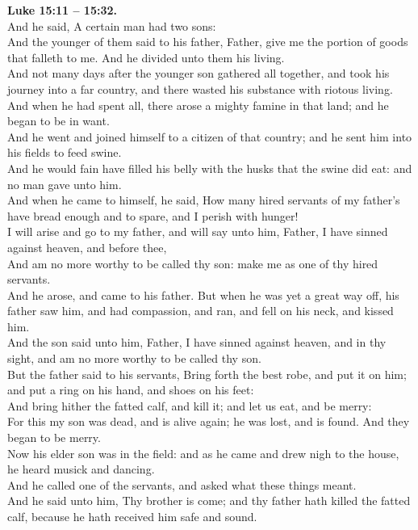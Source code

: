 \documentclass[10pt]{article} %
\begin{document}
{\begin{minipage}[t]{0.45\textwidth}
\textbf{Luke 15:11 -- 15:32.}\\
And he said, A certain man had two sons:\\
And the younger of them said to his father, Father, give me the portion of goods that falleth to me. And he divided unto them his living.\\
And not many days after the younger son gathered all together, and took his journey into a far country, and there wasted his substance with riotous living.\\
And when he had spent all, there arose a mighty famine in that land; and he began to be in want.\\
And he went and joined himself to a citizen of that country; and he sent him into his fields to feed swine.\\
And he would fain have filled his belly with the husks that the swine did eat: and no man gave unto him.\\
And when he came to himself, he said, How many hired servants of my father's have bread enough and to spare, and I perish with hunger!\\
I will arise and go to my father, and will say unto him, Father, I have sinned against heaven, and before thee,\\
And am no more worthy to be called thy son: make me as one of thy hired servants.\\
And he arose, and came to his father. But when he was yet a great way off, his father saw him, and had compassion, and ran, and fell on his neck, and kissed him.\\
And the son said unto him, Father, I have sinned against heaven, and in thy sight, and am no more worthy to be called thy son.\\
But the father said to his servants, Bring forth the best robe, and put it on him; and put a ring on his hand, and shoes on his feet:\\
And bring hither the fatted calf, and kill it; and let us eat, and be merry:\\
For this my son was dead, and is alive again; he was lost, and is found. And they began to be merry.\\
Now his elder son was in the field: and as he came and drew nigh to the house, he heard musick and dancing.\\
And he called one of the servants, and asked what these things meant.\\
And he said unto him, Thy brother is come; and thy father hath killed the fatted calf, because he hath received him safe and sound.\\

\end{minipage}}
\end{document}
